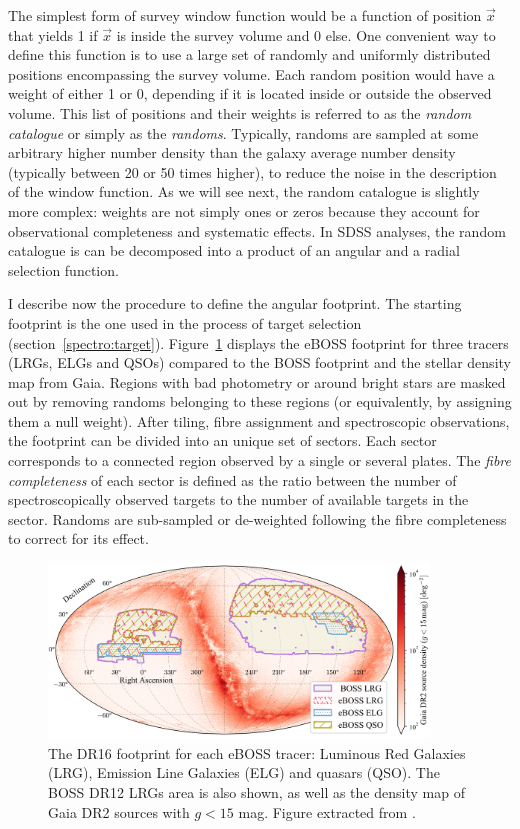 The simplest form of survey window function would be a function of position $\vec{x}$ 
that yields 1 if $\vec{x}$ is inside the survey volume and 0 else. 
One convenient way to define this function is to use a large set of randomly 
and uniformly distributed positions encompassing the survey volume. 
Each random position would have a weight of either 1 or 0, 
depending if it is located inside or outside the observed volume. 
This list of positions and their weights is referred to as the 
\emph{random catalogue} or simply as the \emph{randoms}.  
Typically, randoms are sampled at some arbitrary higher number density than the 
galaxy average number density (typically between 20 or 50 times higher), 
to reduce the noise in the description of the window function. 
As we will see next, the random catalogue is slightly more complex: 
weights are not simply ones or zeros because they account for observational completeness and systematic effects. 
In SDSS analyses, the random catalogue is can be decomposed into a product of an angular and a radial selection function.

I describe now the procedure to define the angular footprint. 
The starting footprint is the one used in the process of target selection 
(section~\ref{spectro:target}).
Figure~\ref{fig:eboss_footprint} displays the eBOSS footprint for three tracers 
(LRGs, ELGs and QSOs) compared to the BOSS footprint and the stellar density map from Gaia. 
Regions with bad photometry or around 
bright stars are masked out by removing randoms belonging to these regions
(or equivalently, by assigning them a null weight). 
After tiling, fibre assignment and spectroscopic observations, the footprint 
can be divided into an unique set of sectors. Each sector corresponds to a connected region
observed by a single or several plates. 
The \emph{fibre completeness} of each sector is defined as the ratio between 
the number of spectroscopically observed targets to the number of available targets in the sector. 
Randoms are sub-sampled or de-weighted following the fibre completeness to correct for its effect. 

\begin{figure}
    \centering 
    \includegraphics[width=0.9\textwidth]{fig/galaxies/eboss_footprint.png}
    \caption{ The DR16 footprint for each eBOSS tracer: Luminous Red Galaxies (LRG), 
    Emission Line Galaxies (ELG) and quasars (QSO). The BOSS DR12 LRGs area is also shown, 
    as well as the density map of Gaia DR2 sources with $g < 15$ mag.
    Figure extracted from \cite{zhaoCompletedSDSSIVExtended2021}.} 
    \label{fig:eboss_footprint}
\end{figure}

